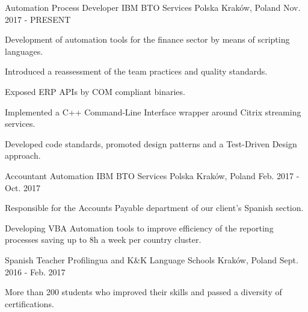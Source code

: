 

\begin{cventries}

  \cventry
    {Automation Process Developer} %
    {IBM BTO Services Polska} %
    {Kraków, Poland} %
    {Nov. 2017 - PRESENT} %
    {
      \begin{cvitems} %
        \item {Development of automation tools for the finance sector by means of scripting languages.}
        \item {Introduced a reassessment of the team practices and quality standards.}
		\item {Exposed ERP APIs by COM compliant binaries.}
		\item {Implemented a C++ Command-Line Interface wrapper around Citrix streaming services.}
        \item {Developed code standards, promoted design patterns and a Test-Driven Design approach.}
      \end{cvitems}
    }

  \cventry
    {Accountant Automation} %
    {IBM BTO Services Polska} %
	{Kraków, Poland} %
	{Feb. 2017 - Oct. 2017} %
    {
      \begin{cvitems} %
        \item {Responsible for the Accounts Payable department of our client's Spanish section.}
        \item {Developing VBA Automation tools to improve efficiency of the reporting processes saving up to 8h a week per country cluster.}
      \end{cvitems}
    }

  \cventry
    {Spanish Teacher} %
    {Profilingua and K\&K Language Schools} %
	{Kraków, Poland} %
	{Sept. 2016 - Feb. 2017} %
    {
      \begin{cvitems} %
        \item {More than 200 students who improved their skills and passed a diversity of certifications.}
      \end{cvitems}
    }

\end{cventries}
